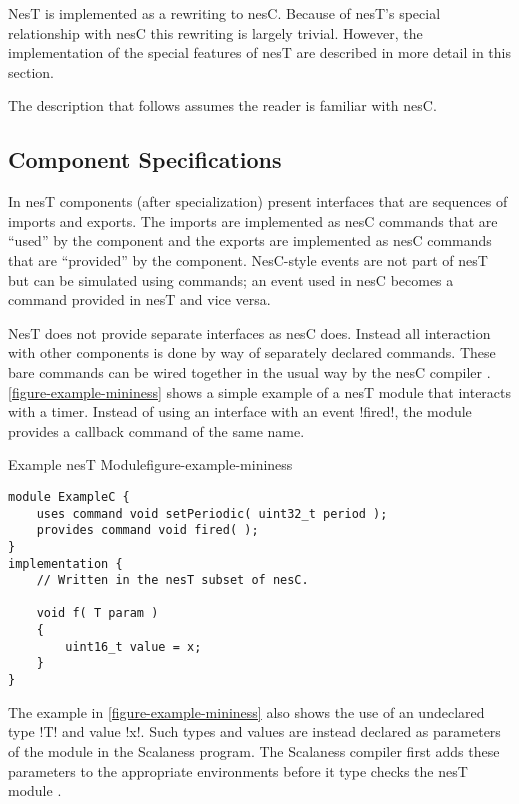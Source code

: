 NesT is implemented as a rewriting to nesC. Because of nesT's special relationship with nesC
this rewriting is largely trivial. However, the implementation of the special features of nesT
are described in more detail in this section.

The description that follows assumes the reader is familiar with nesC.

\subsection{Component Specifications}
\label{section-component-specifications}

In nesT components (after specialization) present interfaces that are sequences of imports and
exports. The imports are implemented as nesC commands that are ``used'' by the component and the
exports are implemented as nesC commands that are ``provided'' by the component. NesC-style
events are not part of nesT but can be simulated using commands; an event used in nesC becomes a
command provided in nesT and vice versa.


NesT does not provide separate interfaces as nesC does. Instead all interaction with other
components is done by way of separately declared commands. These bare commands can be wired
together in the usual way by the nesC compiler \cite{Gay-nesC-2003}.
\autoref{figure-example-mininess} shows a simple example of a nesT module that interacts with a
timer. Instead of using an interface with an event !fired!, the module provides a callback
command of the same name.

\singlespace
\begin{fpfig}[tbhp]{Example nesT Module}{figure-example-mininess}
{
\begin{lstlisting}[language=nesC]
module ExampleC {
    uses command void setPeriodic( uint32_t period );
    provides command void fired( );
}
implementation {
    // Written in the nesT subset of nesC.

    void f( T param )
    {
        uint16_t value = x;
    }
}
\end{lstlisting}
}
\end{fpfig}
\primaryspacing

The example in \autoref{figure-example-mininess} also shows the use of an undeclared type !T!
and value !x!. Such types and values are instead declared as parameters of the module in the
Scalaness program. The Scalaness compiler first adds these parameters to the appropriate
environments before it type checks the nesT module \cite{watson-masters-2013}.

